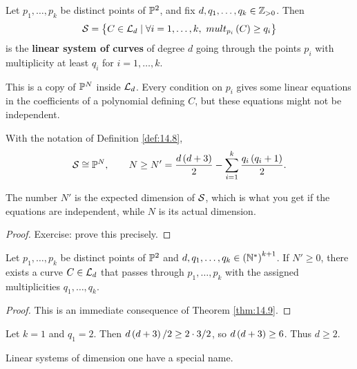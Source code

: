 
\begin{definition}
\label{def:14.8}
Let $ p_1, \dots, p_k $ be distinct points of $ \P^2 $, and fix $ d, q_1, \dots, q_k \in \Z_{> 0} $. Then
$$ \SS = \cbr{C \in \LL_d \mid \forall i = 1, \dots, k, \ mult_{p_i}\br{C} \ge q_i} $$
is the \textbf{linear system of curves} of degree $ d $ going through the points $ p_i $ with multiplicity at least $ q_i $ for $ i = 1, \dots, k $.
\end{definition}

This is a copy of $ \P^N $ inside $ \LL_d $. Every condition on $ p_i $ gives some linear equations in the coefficients of a polynomial defining $ C $, but these equations might not be independent.

\begin{theorem}
\label{thm:14.9}
With the notation of Definition \ref{def:14.8},
$$ \SS \cong \P^N, \qquad N \ge N' = \dfrac{d\br{d + 3}}{2} - \sum_{i = 1}^k \dfrac{q_i\br{q_i + 1}}{2}. $$
\end{theorem}

The number $ N' $ is the expected dimension of $ \SS $, which is what you get if the equations are independent, while $ N $ is its actual dimension.

\begin{proof}
Exercise: prove this precisely.
\end{proof}

\pagebreak

\begin{corollary}
Let $ p_1, \dots, p_k $ be distinct points of $ \P^2 $ and $ d, q_1, \dots, q_k \in \br{\N^*}^{k + 1} $. If $ N' \ge 0 $, there exists a curve $ C \in \LL_d $ that passes through $ p_1, \dots, p_k $ with the assigned multiplicities $ q_1, \dots, q_k $.
\end{corollary}

\begin{proof}
This is an immediate consequence of Theorem \ref{thm:14.9}.
\end{proof}

\begin{example*}
Let $ k = 1 $ and $ q_1 = 2 $. Then $ d\br{d + 3} / 2 \ge 2 \cdot 3 / 2 $, so $ d\br{d + 3} \ge 6 $. Thus $ d \ge 2 $.
\end{example*}

Linear systems of dimension one have a special name.

